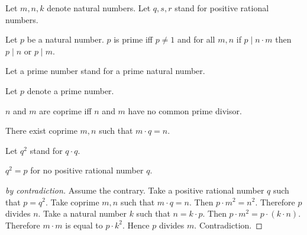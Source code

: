 \documentclass{article}
\begin{document}
  \begin{forthel}
    Let $m, n, k$ denote natural numbers.
    Let $q, s, r$ stand for positive rational numbers.

    \begin{definition}
      Let $p$ be a natural number.
      $p$ is prime iff $p\neq 1$ and for all $m, n$
      if $p\mid n\cdot m$ then $p \mid n$ or $p \mid m$.
    \end{definition}

    Let a prime number stand for a prime natural number.

    Let $p$ denote a prime number.

    \begin{definition}
      $n$ and $m$ are coprime iff $n$ and $m$ have no common prime divisor.
    \end{definition}

    \begin{axiom}
      There exist coprime $m,n$ such that $m \cdot q = n$.
    \end{axiom}

    Let $q^{2}$ stand for $q \cdot q$.

    \begin{proposition}
      $q^{2} = p$ for no positive rational number $q$.
    \end{proposition}
    \begin{proof}[by contradiction]
      Assume the contrary.
      Take a positive rational number $q$ such that $p = q^{2}$.
      Take coprime $m,n$ such that $m \cdot q = n$.
      Then $p \cdot m^{2} = n^{2}$.
      Therefore $p$ divides $n$.
      Take a natural number $k$ such that $n = k \cdot p$.
      Then $p \cdot m^{2} = p \cdot (k \cdot n)$.
      Therefore $m \cdot m$ is equal to $p \cdot k^{2}$.
      Hence $p$ divides $m$.
      Contradiction.
    \end{proof}
  \end{forthel}
\end{document}

